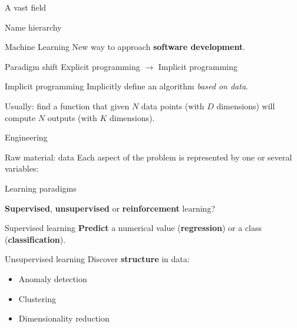 \begin{frame}{A vast field}
\end{frame}

\begin{frame}{Name hierarchy}
\end{frame}

\begin{frame}{Machine Learning}
  New way to approach \textbf{software development}.
  \vfill
  \begin{block}{Paradigm shift}
  Explicit programming $\rightarrow$ Implicit programming
  \end{block}
\end{frame}

\begin{frame}{Implicit programming}
  Implicitly define an algorithm \emph{based on data}.

  Usually: find a function that given $N$ data points (with $D$ dimensions) will compute $N$ outputs (with $K$ dimensions).
\end{frame}

\begin{frame}{Engineering}
\end{frame}

\begin{frame}{Raw material: data}
  Each aspect of the problem is represented by one or several variables:
\end{frame}

\begin{frame}{Learning paradigms}

  \textbf{Supervised}, \textbf{unsupervised} or \textbf{reinforcement} learning?
\end{frame}

\begin{frame}{Supervised learning}
  \textbf{Predict} a numerical value (\textbf{regression}) or a class (\textbf{classification}).
\end{frame}

\begin{frame}{Unsupervised learning}
  Discover \textbf{structure} in data:

  \begin{itemize}[<+(1)->]
    \item Anomaly detection
    \item Clustering
    \item Dimensionality reduction
  \end{itemize}
\end{frame}

